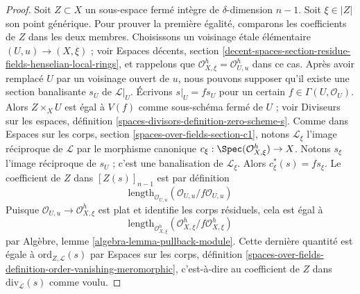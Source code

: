 \begin{proof}
Soit $Z \subset X$ un sous-espace fermé intègre de $\delta$-dimension $n -
1$. Soit $\xi \in |Z|$ son point générique. Pour prouver la première égalité,
comparons les coefficients de $Z$ dans les deux membres. Choisissons un
voisinage \'etale élémentaire $(U, u) \to (X, \xi)$ ; voir Espaces décents, section
\ref{decent-spaces-section-residue-fields-henselian-local-rings}, et rappelons
que $\mathcal{O}_{X, \xi}^h = \mathcal{O}_{U, u}^h$ dans ce cas. Après avoir
remplacé $U$ par un voisinage ouvert de $u$, nous pouvons supposer qu'il existe
une section banalisante $s_U$ de $\mathcal{L}|_U$. Écrivons $s|_U = f s_U$ pour
un certain $f \in \Gamma(U, \mathcal{O}_U)$. Alors $Z \times_X U$ est égal à
$V(f)$ comme sous-schéma fermé de $U$ ; voir Diviseurs sur les espaces,
définition \ref{spaces-divisors-definition-zero-scheme-s}. Comme dans Espaces
sur les corps, section \ref{spaces-over-fields-section-c1}, notons
$\mathcal{L}_\xi$ l'image réciproque de $\mathcal{L}$ par le morphisme canonique
$c_\xi : \Spec(\mathcal{O}_{X, \xi}^h) \to X$. Notons $s_\xi$ l'image réciproque de
$s_U$ ; c'est une banalisation de $\mathcal{L}_\xi$. Alors
$c_\xi^*(s) = fs_\xi$. Le coefficient de $Z$ dans $[Z(s)]_{n - 1}$ est par
définition
$$
\text{length}_{\mathcal{O}_{U, u}}(\mathcal{O}_{U, u}/f\mathcal{O}_{U, u})
$$
Puisque $\mathcal{O}_{U, u} \to \mathcal{O}_{X, \xi}^h$ est plat et identifie
les corps résiduels, cela est égal à
$$
\text{length}_{\mathcal{O}_{X, \xi}^h}
(\mathcal{O}_{X, \xi}^h/f\mathcal{O}_{X, \xi}^h)
$$
par Algèbre, lemme \ref{algebra-lemma-pullback-module}. Cette dernière quantité
est égale à $\text{ord}_{Z, \mathcal{L}}(s)$ par Espaces sur les corps,
définition \ref{spaces-over-fields-definition-order-vanishing-meromorphic},
c'est-à-dire au coefficient de $Z$ dans $\text{div}_\mathcal{L}(s)$ comme
voulu.
\end{proof}

